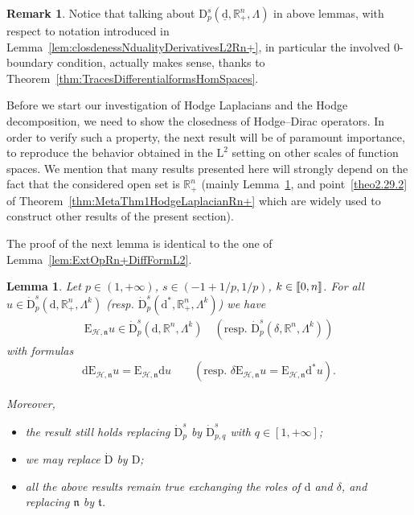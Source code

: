 \documentclass[10pt]{amsart}
\newtheorem{lemm}[theo]{Lemma}\newtheorem{prop}[theo]{Proposition}\newtheorem{coro}[theo]{Corollary}\newtheorem{conj}[theo]{Conjecture}
\theoremstyle{definition}\newtheorem{defi}[theo]{Definition}\newtheorem{rema}[theo]{Remark}\newtheorem{exam}[theo]{Example}\newtheorem{exem}[theo]{Example}\newtheorem{nota}[theo]{Notation}
\newcommand{\bbR}{\mathbb{R}}
\newcommand{\rmd}{\mathrm{d}}
\newcommand{\rmD}{\mathrm{D}}
\newcommand{\rmL}{\mathrm{L}}
\newcommand{\rmE}{\mathrm{E}}
\newcommand{\clH}{\mathcal{H}}
\newcommand{\fkn}{\mathfrak{n}}
\newcommand{\fkt}{\mathfrak{t}}
\newcommand{\llbracket}{\mathopen{[\mkern -2.7mu[}}
\newcommand{\rrbracket}{\mathclose{]\mkern -2.7mu]}}
\newcommand{\llb}{\llbracket}
\newcommand{\rrb}{\rrbracket}
\begin{document}
\begin{rema}
Notice that talking about $\rmD^{s}_{p}(\underline{\rmd},\bbR^n_+,\Lambda)$ in above lemmas, with respect to notation introduced in Lemma~\ref{lem:closdenessNdualityDerivativesL2Rn+}, in particular the involved $0$-boundary condition, actually makes sense, thanks to Theorem~\ref{thm:TracesDifferentialformsHomSpaces}.
\end{rema}


Before we start our investigation of Hodge Laplacians and the Hodge decomposition, we need to show the closedness of Hodge--Dirac operators. In order to verify such a property, the next result will be of paramount importance, to reproduce the behavior obtained in the $\rmL^2$ setting on other scales of function spaces. We mention that many results presented here will strongly depend on the fact that the considered open set is $\bbR^n_+$ (mainly Lemma~\ref{lem:ExtOpRn+DiffFormHspBspq}, and point~\eqref{theo2.29.2} of Theorem~\ref{thm:MetaThm1HodgeLaplacianRn+} which are widely used to construct other results of the present section).

The proof of the next lemma is identical to the one of Lemma~\ref{lem:ExtOpRn+DiffFormL2}.



\begin{lemm}\label{lem:ExtOpRn+DiffFormHspBspq}
Let $p\in(1,+\infty)$, $s\in(-1+1/p,1/p)$, $k\in\llb 0,n \rrb$. For all $u\in\dot{\rmD}^{s}_{p}(\rmd,\bbR^n_+,\Lambda^{k})$ (resp. $\dot{\rmD}^{s}_{p}({\rmd}^\ast,\bbR^n_+,\Lambda^{k})$) we have
\begin{align*}
\rmE_{\clH,\fkn} u \in \dot{\rmD}^{s}_{p}\left(\rmd,\bbR^n,\Lambda^{k}\right) \quad\left(\text{resp. } \dot{\rmD}^{s}_{p}\left(\delta,\bbR^n,\Lambda^{k}\right)\right)
\end{align*}
with formulas
\begin{align*}
\rmd \rmE_{\clH,\fkn} u = \rmE_{\clH,\fkn} \rmd u \qquad \left(\text{resp. } \delta \rmE _{\clH,\fkn} u = \rmE_{\clH,\fkn} \rmd^\ast u \right).
\end{align*}

Moreover,
\begin{itemize}
\item the result still holds replacing $\dot{\rmD}^{s}_{p}$ by $\dot{\rmD}^{s}_{p,q}$ with $q\in[1,+\infty]$;

\item we may replace $\dot{\rmD}$ by $\rmD$;

\item all the above results remain true exchanging the roles of $\rmd$ and $\delta$, and replacing $\fkn$ by $\fkt$.
\end{itemize}
\end{lemm}
\end{document}
